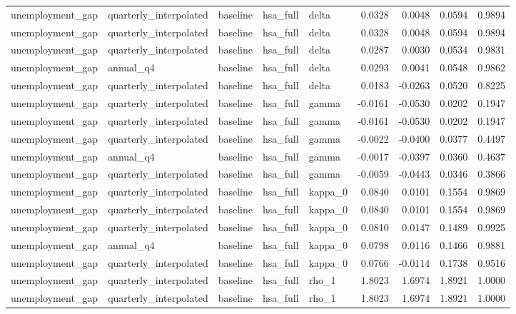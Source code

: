 \begin{tabular}{lllllrrrr}
unemployment\_gap & quarterly\_interpolated & baseline & hsa\_full & delta & 0.0328 & 0.0048 & 0.0594 & 0.9894 \\
unemployment\_gap & quarterly\_interpolated & baseline & hsa\_full & delta & 0.0328 & 0.0048 & 0.0594 & 0.9894 \\
unemployment\_gap & quarterly\_interpolated & baseline & hsa\_full & delta & 0.0287 & 0.0030 & 0.0534 & 0.9831 \\
unemployment\_gap & annual\_q4 & baseline & hsa\_full & delta & 0.0293 & 0.0041 & 0.0548 & 0.9862 \\
unemployment\_gap & quarterly\_interpolated & baseline & hsa\_full & delta & 0.0183 & -0.0263 & 0.0520 & 0.8225 \\
unemployment\_gap & quarterly\_interpolated & baseline & hsa\_full & gamma & -0.0161 & -0.0530 & 0.0202 & 0.1947 \\
unemployment\_gap & quarterly\_interpolated & baseline & hsa\_full & gamma & -0.0161 & -0.0530 & 0.0202 & 0.1947 \\
unemployment\_gap & quarterly\_interpolated & baseline & hsa\_full & gamma & -0.0022 & -0.0400 & 0.0377 & 0.4497 \\
unemployment\_gap & annual\_q4 & baseline & hsa\_full & gamma & -0.0017 & -0.0397 & 0.0360 & 0.4637 \\
unemployment\_gap & quarterly\_interpolated & baseline & hsa\_full & gamma & -0.0059 & -0.0443 & 0.0346 & 0.3866 \\
unemployment\_gap & quarterly\_interpolated & baseline & hsa\_full & kappa\_0 & 0.0840 & 0.0101 & 0.1554 & 0.9869 \\
unemployment\_gap & quarterly\_interpolated & baseline & hsa\_full & kappa\_0 & 0.0840 & 0.0101 & 0.1554 & 0.9869 \\
unemployment\_gap & quarterly\_interpolated & baseline & hsa\_full & kappa\_0 & 0.0810 & 0.0147 & 0.1489 & 0.9925 \\
unemployment\_gap & annual\_q4 & baseline & hsa\_full & kappa\_0 & 0.0798 & 0.0116 & 0.1466 & 0.9881 \\
unemployment\_gap & quarterly\_interpolated & baseline & hsa\_full & kappa\_0 & 0.0766 & -0.0114 & 0.1738 & 0.9516 \\
unemployment\_gap & quarterly\_interpolated & baseline & hsa\_full & rho\_1 & 1.8023 & 1.6974 & 1.8921 & 1.0000 \\
unemployment\_gap & quarterly\_interpolated & baseline & hsa\_full & rho\_1 & 1.8023 & 1.6974 & 1.8921 & 1.0000 \\

\end{tabular}
